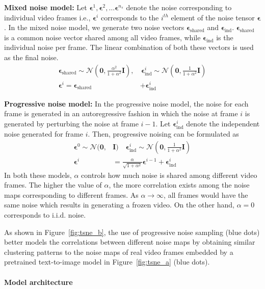 \documentclass[10pt,twocolumn,letterpaper]{article}
\newcommand{\bzero}{\mathbf{0}}
\newcommand{\bI}{\mathbf{I}}
\newcommand{\cN}{\mathcal{N}}
\newcommand{\beps}{\mathbf{\epsilon}}
\newcommand{\new}[1]{#1}
\begin{document}
\textbf{Mixed noise model: }
Let $\beps^{1}, \beps^{2}, \hdots \beps^{n_s}$ denote the noise corresponding to individual video frames i.e., $\beps^{i}$ corresponds to the $i^{th}$ element of the noise tensor $\beps$. In the mixed noise model, we generate two noise vectors $\beps_{\text{shared}}$ and $\beps_{\text{ind}}$. $\beps_{\text{shared}}$ is a common noise vector shared among all video frames, while $\beps_{\text{ind}}$ is the individual noise per frame. The linear combination of both these vectors is used as the final noise.
\begin{align}\label{eq:mixed_kaal} 
    \beps_{\text{shared}} \sim \cN\left(\bzero, \frac{\alpha^2}{1 + \alpha^2}\bI \right),& \,   \beps_{\text{ind}}^{i} \sim \cN\left(\bzero, \frac{1}{1 + \alpha^2}\bI \right) \\
    \beps^{i} = \beps_{\text{shared}}& + \beps_{\text{ind}}^{i} \nonumber
\end{align}

\textbf{Progressive noise model: }
In the progressive noise model, the noise for each frame is generated in an autoregressive fashion in which the noise at frame $i$ is generated by perturbing the noise at frame $i-1$. Let $\beps_{\text{ind}}^{i}$ denote the independent noise generated for frame $i$. Then, progressive noising can be formulated as 
\begin{align}\label{eq:progressive_kaal}
    \beps^{0} \sim \cN(\bzero, &\bI) \quad  \beps_{\text{ind}}^{i} \sim \cN(\bzero, \new{\frac{1}{1 + \alpha^2}\bI)} \\
    \beps^{i} &= \new{\frac{\alpha}{\sqrt{1 + \alpha^2}}} \beps^{i-1} + \beps_{\text{ind}}^{i} \nonumber
\end{align}
In both these models, $\alpha$ controls how much noise is shared among different video frames. The higher the value of $\alpha$, the more correlation exists among the noise maps corresponding to different frames. As $\alpha \to \infty$, all frames would have the same noise which results in generating a frozen video. 
On the other hand, $\alpha=0$ corresponds to i.i.d. noise. 

As shown in Figure~\ref{fig:tsne_b}, the use of progressive noise sampling (blue dots) better models the correlations between different noise maps by obtaining similar clustering patterns to the noise maps of real video frames embedded by a pretrained text-to-image model in Figure~\ref{fig:tsne_a} (blue dots).



\paragraph{Model architecture}
\end{document}
